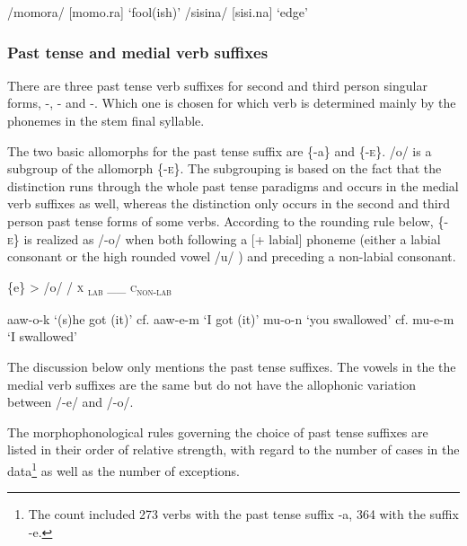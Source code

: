 \ea
\ea
/momora/  [mo{{\textprimstress}mo.ra}]  `fool(ish)'
\ex
/sisina/  [si{{\textprimstress}si.na}]  `edge'
\z
\z

\subsubsection{Past tense and medial verb suffixes}\footnotemark{}\label{sec:2:z:y:x}

There are three past tense verb suffixes for second and third person singular forms, -, - and -.  Which one is chosen for which verb is determined mainly by the phonemes in the stem final syllable. 

The two basic allomorphs for the past tense suffix are \{-a\} and \{-\textsc{e}\}. /\textstyleStyleVernacularWordsItalic{-}o/ is a subgroup of the allomorph \{-\textsc{e}\}. The subgrouping is based on the fact that the  distinction runs through the whole past tense paradigms and occurs in the medial verb suffixes as well, whereas the \textstyleStyleVernacularWordsItalic{-} distinction only occurs in the second and third person past tense forms of some verbs.  According to the rounding rule below, \{-\textsc{e}\} is realized as /-o/ when both following a [+ labial] phoneme (either a labial consonant or the high rounded vowel /u/ ) and preceding a non-labial consonant. 

\ea
\{e\} {{\textgreater}} /o/  /  \textsc{x} \textsubscript{\textsc{lab}}  \_\_  \textsc{c}\textsubscript{\textsc{non-lab}} 
\z

\ea
\ea
aaw-o-k  `(s)he got (it)'  cf.  aaw-e-m  `I got (it)'
\ex
mu-o-n  `you swallowed'  cf.  mu-e-m  `I swallowed'
\z
\z

The discussion below only mentions the past tense suffixes. The vowels in the  the medial verb suffixes are the same but do not have the allophonic variation between /-e/ and /-o/.  

The morphophonological rules governing the choice of past tense suffixes are listed in their order of relative strength, with regard to the number of cases in the data\footnote{The count included 273 verbs with the past tense suffix  -a,  364 with the suffix -e.} as well as the number of exceptions.

